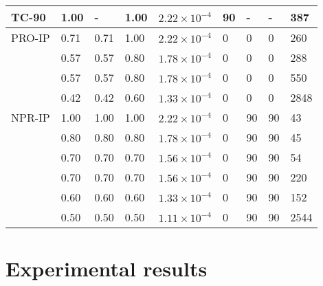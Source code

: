 \documentclass[preprint,5p,twocolumn,11pt,sort&compress]{elsarticle}
\newcommand{\marked}[1]{\textcolor{red}{#1}}
\begin{document}
\begin{table*}[htbp]
\begin{tabular}{p{2cm}p{1.5cm}p{1.5cm}p{1.5cm}p{2.5cm}p{1cm}p{1cm}p{1cm}p{1cm}}
    \hline
    TC-90 & 1.00  & -     & 1.00  & $2.22\times 10^{-4}$ & 90    & -     & -     & 387 \\
    \hline
    PRO-IP & 0.71  & 0.71  & 1.00  & $2.22\times 10^{-4}$ & 0     & 0     & 0     & 260 \\
          & 0.57  & 0.57  & 0.80  & $1.78\times 10^{-4}$ & 0     & 0     & 0     & 288 \\
          & 0.57  & 0.57  & 0.80  & $1.78\times 10^{-4}$ & 0     & 0     & 0     & 550 \\
          & 0.42  & 0.42  & 0.60  & $1.33\times 10^{-4}$ & 0     & 0     & 0     & 2848 \\
    \hline
    NPR-IP & 1.00  & 1.00  & 1.00  & $2.22\times 10^{-4}$ & 0     & 90    & 90    & 43 \\
          & 0.80  & 0.80  & 0.80  & $1.78\times 10^{-4}$ & 0     & 90    & 90    & 45 \\
          & 0.70  & 0.70  & 0.70  & $1.56\times 10^{-4}$ & 0     & 90    & 90    & 54 \\
          & 0.70  & 0.70  & 0.70  & $1.56\times 10^{-4}$ & 0     & 90    & 90    & 220 \\
          & 0.60  & 0.60  & 0.60  & $1.33\times 10^{-4}$ & 0     & 90    & 90    & 152 \\
          & 0.50  & 0.50  & 0.50  & $1.11\times 10^{-4}$ & 0     & 90    & 90    & 2544 \\
    \hline
    \end{tabular}%
  \label{Tab:TestMatrix}%
\end{table*}%



\section{Experimental results}
\end{document}
